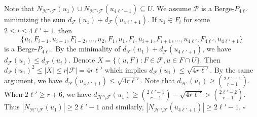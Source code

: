 \documentclass[12pt]{article}%
\newenvironment{proof}{{\noindent\it Proof.}}{\hfill $\square$\par}
\newcommand{\ber}{\text{Berge-}}
\newcommand{\mh}{\mathcal{H}}
\begin{document}
\begin{proof} Note that
      $N_{\mh'\setminus \mathcal{ F}}(u_1)\cup N_{\mh'\setminus \mathcal{ F}}(u_{4\ell'+1})\subseteq U$. %
       We  assume $\mathcal{P}$ is a $\ber P_{4\ell'}$  minimizing the sum $d_{\mathcal{F}}(u_1)+d_{\mathcal{F}}(u_{4\ell'+1})$. If $u_1\in F_i$ for some $2\le i\le 4\ell'+1$, then $$\{u_i,F_{i-1},u_{i-1},F_{i-2},\dots,u_2,F_1,u_1,F_i,u_{i+1},F_{i+1},\dots,u_{4\ell'},F_{4\ell'},u_{4\ell'+1}\}$$
    is a $\ber P_{4\ell'}$. By the minimality of $d_{\mathcal{F}}(u_1)+d_{\mathcal{F}}(u_{4\ell'+1})$, we have $d_{\mathcal{F}}(u_1)\leq d_{\mathcal{F}}(u_i)$. Denote $X=\{(u,F):F\in \mathcal{F},u\in F\cap U\}$. Then $d_{\mathcal{F}}(u_1)^2\le |X|\le r|\mathcal{F}|=4r\ell'$ which implies
    $d_{\mathcal{F}}(u_1)\leq\sqrt{4r\ell'}$. By the same argument, we have  $d_{\mathcal{F}}(u_{4\ell'+1})\leq \sqrt{4r\ell'}$. Note that $d_{\mh'}(u_1)\ge \binom{2\ell'-1}{r-1}$.
    When $2\ell'\geq r+6$, we have $d_{\mh'\setminus \mathcal{F}}(u_1)\ge \binom{2\ell'-1}{r-1}-\sqrt{4r\ell'}> \binom{2\ell'-2}{r-1}$.  Thus $|N_{\mh'\setminus \mathcal{F}}(u_1)|\geq 2\ell'-1$ and similarly, $|N_{\mh'\setminus \mathcal{F}}(u_{4\ell'+1})|\geq 2\ell'-1$.
\end{proof}
\end{document}
